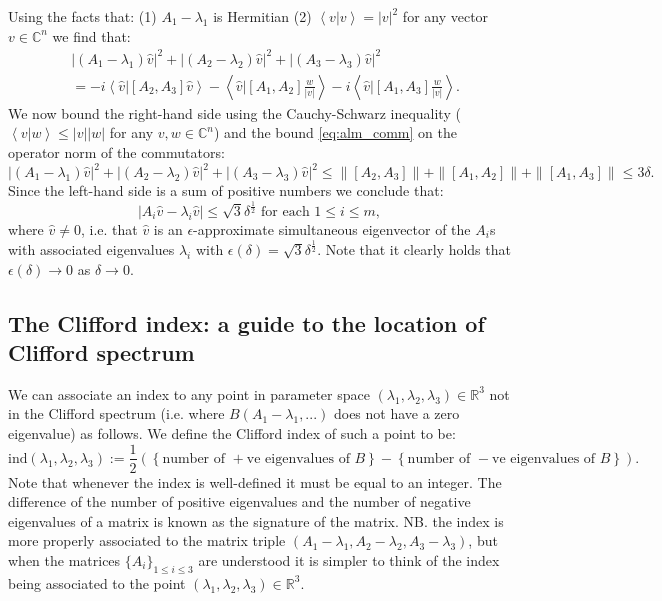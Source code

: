 \documentclass[a4paper]{article}
\newcommand{\ip}[2]{\ensuremath{ \left< \left. #1 \right| #2 \right> } } %
\begin{document}
Using the facts that: (1) $A_1 - \lambda_1$ is Hermitian (2) $\ip{v}{v} = |v|^2$ for any vector $v \in \mathbb{C}^n$ we find that:
\begin{equation}
\begin{split}
	&|(A_1 - \lambda_1) \hat{v}|^2 + |(A_2 - \lambda_2) \hat{v}|^2 + |(A_3 - \lambda_3) \hat{v}|^2 	\\
	&= - i \ip{\hat{v}}{ [A_2,A_3] \hat{v}} - \ip{\hat{v}}{ [A_1,A_2] \frac{w}{|v|} } - i \ip{\hat{v}}{ [A_1,A_3] \frac{w}{|v|} }.
\end{split}
\end{equation}
We now bound the right-hand side using the Cauchy-Schwarz inequality ($\ip{v}{w} \leq |v| |w|$ for any $v, w \in \mathbb{C}^n$) and the bound \eqref{eq:alm_comm} on the operator norm of the commutators:
\begin{equation}
	\left| (A_1 - \lambda_1) \hat{v} \right|^2 + \left| (A_2 - \lambda_2) \hat{v} \right|^2 + \left| (A_3 - \lambda_3) \hat{v} \right|^2 \leq \| [A_2,A_3] \| + \| [A_1,A_2] \| + \| [A_1,A_3] \| \leq 3 \delta.
\end{equation}
Since the left-hand side is a sum of positive numbers we conclude that: 
\begin{equation}
	\left| A_i \hat{v} - \lambda_i \hat{v} \right| \leq \sqrt{3} \delta^{\frac{1}{2}} \text{ for each $1 \leq i \leq m$},
\end{equation}
where $\hat{v} \neq 0$, i.e. that $\hat{v}$ is an $\epsilon$-approximate simultaneous eigenvector of the $A_i$s with associated eigenvalues $\lambda_i$ with $\epsilon(\delta) = \sqrt{3} \delta^{\frac{1}{2}}$. Note that it clearly holds that $\epsilon(\delta) \rightarrow 0$ as $\delta \rightarrow 0$.

\subsection{The Clifford index: a guide to the location of Clifford spectrum} \label{sec:clif_ind}

We can associate an index to any point in parameter space $(\lambda_1,\lambda_2,\lambda_3) \in \mathbb{R}^3$ not in the Clifford spectrum (i.e. where $B(A_1 - \lambda_1,...)$ does not have a zero eigenvalue) as follows. We define the {Clifford index} of such a point to be:
\begin{equation} \label{eq:index}
	\text{ind}(\lambda_1,\lambda_2,\lambda_3) := \frac{1}{2} \left( \left\{ \text{number of $+$ve eigenvalues of $B$} \right\} - \left\{ \text{number of $-$ve eigenvalues of $B$} \right\} \right).
\end{equation}
Note that whenever the index is well-defined it must be equal to an integer. The difference of the number of positive eigenvalues and the number of negative eigenvalues of a matrix is known as the {signature} of the matrix. NB. the index is more properly associated to the matrix triple $(A_1 - \lambda_1,A_2 - \lambda_2,A_3 - \lambda_3)$, but when the matrices $\{A_i\}_{1 \leq i \leq 3}$ are understood it is simpler to think of the index being associated to the point $(\lambda_1,\lambda_2,\lambda_3) \in \mathbb{R}^3$. 
\end{document}
